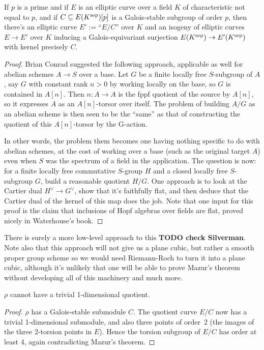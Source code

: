 \begin{theorem}\label{Elliptic_curve_quotient_by_finite_subgroup} If $p$ is a prime and
  if $E$ is an elliptic curve over a field $K$ of characteristic not equal to $p$,
   and if $C\subseteq E(K^{\operatorname{sep}})[p]$ is a Galois-stable
  subgroup of order $p$, then there's an elliptic curve $E':=$``$E/C$'' over $K$ and an isogeny of elliptic 
  curves $E\to E'$ over $K$ inducing a Galois-equivariant surjection $E(K^{\operatorname{sep}})\to E'(K^{\operatorname{sep}})$ 
  with kernel precisely $C$.
\end{theorem}
\begin{proof}
  Brian Conrad suggested the following approach, applicable as well for abelian schemes $A\to S$ 
  over a base.  Let $G$ be a finite locally free $S$-subgroup of $A$, say $G$ with constant 
  rank $n > 0$ by working locally on the base, so $G$ is contained in $A[n]$.  Then 
  $n: A \to A$ is the fppf quotient of the source by $A[n]$, so it expresses $A$ as an 
  $A[n]$-torsor over itself.  The problem of building $A/G$ as an abelian scheme is then 
  seen to be the “same” as that of constructing the quotient of this $A[n]$-torsor by the G-action.

  In other words, the problem them becomes one having nothing specific to do with abelian schemes, 
  at the cost of working over a base (such as the original target $A$) even when $S$ was the 
  spectrum of a field in the application. The question is now: for a finite locally free 
  commutative $S$-group $H$ and a closed locally free $S$-subgroup $G$, build a reasonable quotient 
  $H/G$. One approach is to look at the Cartier dual $H^\vee\to G^\vee$, show that it's faithfully 
  flat, and then deduce that the Cartier dual of the kernel of this map does the job. Note that 
  one input for this proof is the claim that inclusions of Hopf algebras over fields are flat, 
  proved nicely in Waterhouse’s book.
\end{proof}

There is surely a more low-level approach to this {\bf TODO check Silverman}. Note also that this approach will not
give us a plane cubic, but rather a smooth proper group scheme so we would need Riemann-Roch
to turn it into a plane cubic, although it's unlikely that one will be able to prove Mazur's
theorem without developing all of this machinery and much more.

\begin{corollary}\label{Frey_curve_no_trivial_quotient} $\rho$ cannot have a trivial 1-dimensional quotient.
\end{corollary}
\begin{proof} $\rho$ has a Galois-stable submodule $C$. The quotient curve $E/C$ now has
  a trivial 1-dimensional submodule, and also three points of order~2 (the images of the three
  2-torsion points in $E$). Hence the torsion subgroup of $E/C$ has order at least 4\ell{}, 
  again contradicting Mazur's theorem.
\end{proof}

